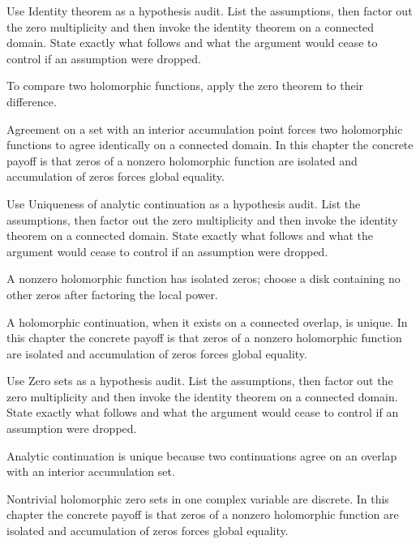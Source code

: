 \begin{exercise}\label{exr:iv07-04}
Use Identity theorem as a hypothesis audit. List the assumptions, then factor out the zero multiplicity and then invoke the identity theorem on a connected domain. State exactly what follows and what the argument would cease to control if an assumption were dropped.
\end{exercise}
\begin{hint}
To compare two holomorphic functions, apply the zero theorem to their difference.
\end{hint}
\begin{solution}
Agreement on a set with an interior accumulation point forces two holomorphic functions to agree identically on a connected domain. In this chapter the concrete payoff is that zeros of a nonzero holomorphic function are isolated and accumulation of zeros forces global equality.
\end{solution}

\begin{exercise}\label{exr:iv07-05}
Use Uniqueness of analytic continuation as a hypothesis audit. List the assumptions, then factor out the zero multiplicity and then invoke the identity theorem on a connected domain. State exactly what follows and what the argument would cease to control if an assumption were dropped.
\end{exercise}
\begin{hint}
A nonzero holomorphic function has isolated zeros; choose a disk containing no other zeros after factoring the local power.
\end{hint}
\begin{solution}
A holomorphic continuation, when it exists on a connected overlap, is unique. In this chapter the concrete payoff is that zeros of a nonzero holomorphic function are isolated and accumulation of zeros forces global equality.
\end{solution}

\begin{exercise}\label{exr:iv07-06}
Use Zero sets as a hypothesis audit. List the assumptions, then factor out the zero multiplicity and then invoke the identity theorem on a connected domain. State exactly what follows and what the argument would cease to control if an assumption were dropped.
\end{exercise}
\begin{hint}
Analytic continuation is unique because two continuations agree on an overlap with an interior accumulation set.
\end{hint}
\begin{solution}
Nontrivial holomorphic zero sets in one complex variable are discrete. In this chapter the concrete payoff is that zeros of a nonzero holomorphic function are isolated and accumulation of zeros forces global equality.
\end{solution}

